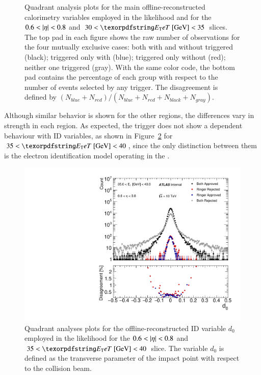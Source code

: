 \begin{figure}[h!]
\caption{\label{fig:quadrant_calo_variables_30GeV}
	Quadrant analysis plots for the main offline-reconstructed
	calorimetry variables employed in the
	likelihood and for the $0.6<\abseta{}<0.8$ and
	$30<\et{}~[\text{GeV}]<35$ slices. 
	The top pad in each figure shows the raw number of observations for the four mutually exclusive cases: both with and without \rnn{}
	triggered (black); triggered only with \rnn{} (blue); triggered only without \rnn{} (red); neither one triggered (gray). With the same color code, the bottom pad contains the percentage of each group with respect to the number of events selected by any trigger. The disagreement is defined by $(N_{blue}+N_{red})/(N_{blue}+N_{red}+N_{black}+N_{gray})$.
}
\end{figure}

Although similar behavior is shown for the other 
regions, the differences vary in strength in each \abseta{} region. As expected, 
the trigger does not show a dependent behaviour with ID variables, as shown in Figure~\ref{fig:quadrant_track_variables_30GeV} for $35<\et{}~[\text{GeV}]<40$, since the only distinction between them is the electron identification model operating in the \fastcalo{}.


\begin{figure}[h!tb]
\centering
\includegraphics[width=.5\textwidth]{sections/analyses/figures/quadrant_plots/HLT_e28_lhtight_nod0_noringer_ivarloose_HLT_e28_lhtight_nod0_ivarloose_trackd0pvunbiased_et4_eta1.pdf}

\caption{\label{fig:quadrant_track_variables_30GeV}
Quadrant analyses plots for the offline-reconstructed ID variable $d_0$ employed in the
likelihood for the $0.6<\abseta{}<0.8$ and $35<\et{}~[\text{GeV}]<40$ slice. The variable $d_0$ is defined as the transverse parameter of the impact point with respect to the collision beam.
}
\end{figure}






